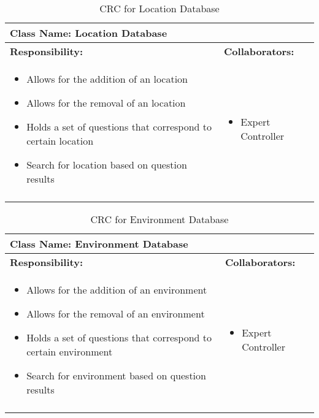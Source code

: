 \documentclass[titlepage]{article}
\begin{document}
	\begin{longtable}{| p{} | p{} |}
			\hline
			 \multicolumn{2}{|l|}{\textbf{Class Name: Location Database}} \\
			\hline
			\textbf{Responsibility:} & \textbf{Collaborators:} \\
			\hline
				\begin{itemize}
					\item  Allows for the addition of an location
					\item Allows for the removal of an location
					\item Holds a set of questions that correspond to certain location
					\item Search for location based on question results
				\end{itemize} & 
				\begin{itemize}
					\item Expert Controller 
				\end{itemize} 
				\\
			\hline
		\caption{CRC for Location Database}
	\end{longtable}
	
	\begin{longtable}{| p{} | p{} |}
			\hline
			 \multicolumn{2}{|l|}{\textbf{Class Name: Environment Database}} \\
			\hline
			\textbf{Responsibility:} & \textbf{Collaborators:} \\
			\hline
				\begin{itemize}
					\item  Allows for the addition of an environment
					\item Allows for the removal of an environment
					\item Holds a set of questions that correspond to certain environment
					\item Search for environment based on question results
				\end{itemize} & 
				\begin{itemize}
					\item Expert Controller
				\end{itemize} 
				\\
			\hline
		\caption{CRC for Environment Database}
	\end{longtable}
	
\end{document}
